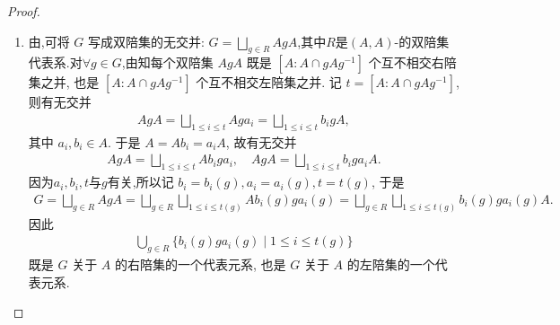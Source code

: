 \documentclass[../../main.tex]{subfiles}%
\begin{document}
\begin{proof}
\begin{enumerate}[(1)]
\item 由,可将 $G$ 写成双陪集的无交并: $G = \bigsqcup_{g\in R} AgA$,其中$R$是$(A,A)$-的双陪集代表系.对$\forall g\in G$,由知每个双陪集 $AgA$ 既是 $[A:A\cap gAg^{-1}]$ 个互不相交右陪集之并, 也是 $[A:A\cap gAg^{-1}]$ 个互不相交左陪集之并. 记 $t = [A:A\cap gAg^{-1}]$, 则有无交并
\begin{align*}
AgA = \bigsqcup_{1\leqslant i\leqslant t} Aga_i = \bigsqcup_{1\leqslant i\leqslant t} b_igA,
\end{align*}
其中 $a_i, b_i \in A$. 于是 $A = Ab_i = a_iA$, 故有无交并
\begin{align*}
AgA = \bigsqcup_{1\leqslant i\leqslant t} Ab_iga_i,\quad AgA = \bigsqcup_{1\leqslant i\leqslant t} b_iga_iA.
\end{align*}
因为$a_i,b_i,t$与$g$有关,所以记 $b_i = b_i(g), a_i = a_i(g), t = t(g)$, 于是
\begin{align*}
G=\bigsqcup_{g\in R}{AgA}=\bigsqcup_{g\in R}{\bigsqcup_{1\leqslant i\leqslant t\left( g \right)}{Ab_i\left( g \right) ga_i\left( g \right)}}=\bigsqcup_{g\in R}{\bigsqcup_{1\leqslant i\leqslant t\left( g \right)}{b_i\left( g \right) ga_i\left( g \right) A}}.
\end{align*}
因此
\begin{align*}
\bigcup_{g\in R} \{ b_i(g)ga_i(g) \mid 1 \leqslant i \leqslant t(g) \}
\end{align*}
既是 $G$ 关于 $A$ 的右陪集的一个代表元系, 也是 $G$ 关于 $A$ 的左陪集的一个代表元系.
\end{enumerate}

\end{proof}
\end{document}
